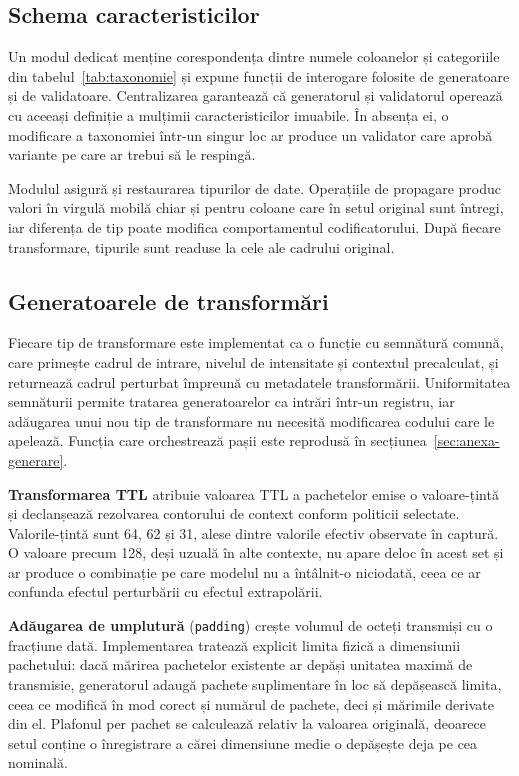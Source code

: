 \subsection{Schema caracteristicilor}\label{subsec:schema}

Un modul dedicat menține corespondența dintre numele coloanelor și categoriile din tabelul~\ref{tab:taxonomie} și expune funcții de interogare folosite de generatoare și de validatoare. Centralizarea garantează că generatorul și validatorul operează cu aceeași definiție a mulțimii caracteristicilor imuabile. În absența ei, o modificare a taxonomiei într-un singur loc ar produce un validator care aprobă variante pe care ar trebui să le respingă.

Modulul asigură și restaurarea tipurilor de date. Operațiile de propagare produc valori în virgulă mobilă chiar și pentru coloane care în setul original sunt întregi, iar diferența de tip poate modifica comportamentul codificatorului. După fiecare transformare, tipurile sunt readuse la cele ale cadrului original.

\subsection{Generatoarele de transformări}\label{subsec:generatoare}

Fiecare tip de transformare este implementat ca o funcție cu semnătură comună, care primește cadrul de intrare, nivelul de intensitate și contextul precalculat, și returnează cadrul perturbat împreună cu metadatele transformării. Uniformitatea semnăturii permite tratarea generatoarelor ca intrări într-un registru, iar adăugarea unui nou tip de transformare nu necesită modificarea codului care le apelează. Funcția care orchestrează pașii este reprodusă în secțiunea~\ref{sec:anexa-generare}.

\textbf{Transformarea TTL} atribuie valoarea TTL a pachetelor emise o valoare-țintă și declanșează rezolvarea contorului de context conform politicii selectate. Valorile-țintă sunt 64, 62 și 31, alese dintre valorile efectiv observate în captură. O valoare precum 128, deși uzuală în alte contexte, nu apare deloc în acest set și ar produce o combinație pe care modelul nu a întâlnit-o niciodată, ceea ce ar confunda efectul perturbării cu efectul extrapolării.

\textbf{Adăugarea de umplutură} (\verb|padding|) crește volumul de octeți transmiși cu o fracțiune dată. Implementarea tratează explicit limita fizică a dimensiunii pachetului: dacă mărirea pachetelor existente ar depăși unitatea maximă de transmisie, generatorul adaugă pachete suplimentare în loc să depășească limita, ceea ce modifică în mod corect și numărul de pachete, deci și mărimile derivate din el. Plafonul per pachet se calculează relativ la valoarea originală, deoarece setul conține o înregistrare a cărei dimensiune medie o depășește deja pe cea nominală.

